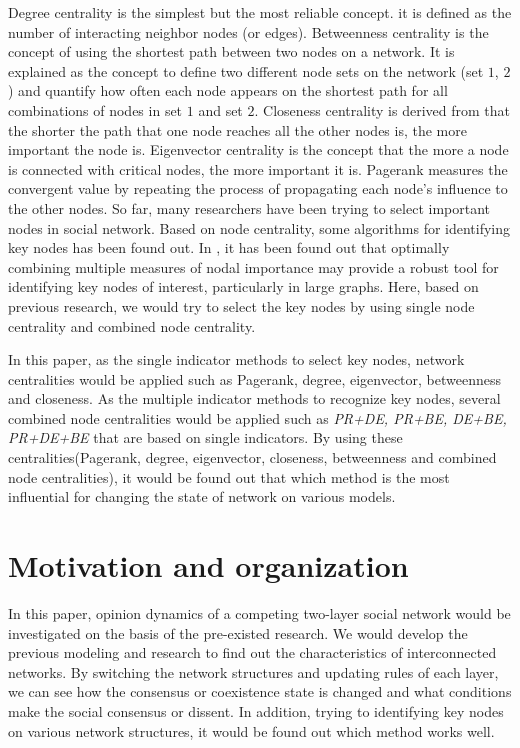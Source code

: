 Degree centrality is the simplest but the most reliable concept. it is defined as the number of interacting neighbor nodes (or edges). Betweenness centrality is the concept of using the shortest path between two nodes on a network. It is explained as the concept to define two different node sets on the network (set $1$, $2$) and quantify how often each node appears on the shortest path for all combinations of nodes in set $1$ and set $2$. Closeness centrality is derived from that the shorter the path that one node reaches all the other nodes is, the more important the node is. Eigenvector centrality is the concept that the more a node is connected with critical nodes, the more important it is. Pagerank measures the convergent value by repeating the process of propagating each node's influence to the other nodes.
So far, many researchers have been trying to select important nodes in social network.\parencite{eom2015, white2003, mesgari2015, hwang1981, huang2014} Based on node centrality, some algorithms for identifying key nodes has been found out. In \parencite{mesgari2015, huang2014}, it has been found out that optimally combining multiple measures of nodal importance may provide a robust tool for identifying key nodes of interest, particularly in large graphs. Here, based on previous research, we would try to select the key nodes by using single node centrality and combined node centrality.

In this paper, as the single indicator methods to select key nodes, network centralities would be applied such as Pagerank, degree, eigenvector, betweenness and closeness. As the multiple indicator methods to recognize key nodes, several combined node centralities would be applied such as \textit{PR+DE, PR+BE, DE+BE, PR+DE+BE} that are based on single indicators.  By using these centralities(Pagerank, degree, eigenvector, closeness, betweenness and combined node centralities), it would be found out that which method is the most influential for changing the state of network on various models.\\  

\section{Motivation and organization}
In this paper, opinion dynamics of a competing two-layer social network would be investigated on the basis of the pre-existed research\parencite{alvarez2016, gomez2015, diep2017, rocca2014}. We would develop the previous modeling and research to find out the characteristics of interconnected networks. By switching the network structures and updating rules of each layer, we can see how the consensus or coexistence state is changed and what conditions make the social consensus or dissent. In addition, trying to identifying key nodes on various network structures, it would be found out which method works well.

